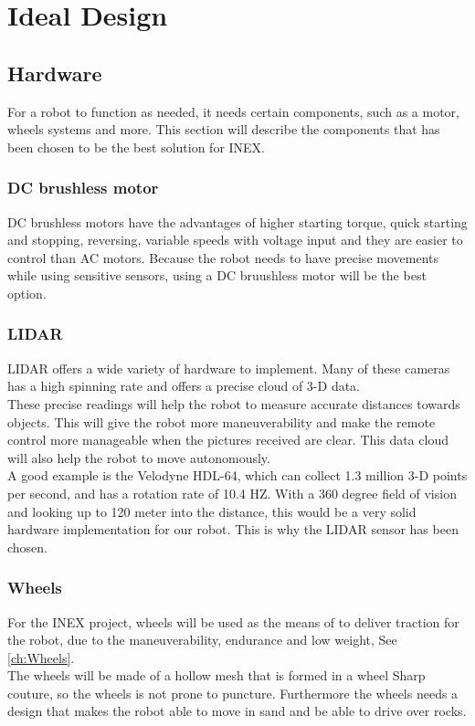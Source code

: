 \chapter{Ideal Design}\label{ch:Implementation Theory}

\section{Hardware}
For a robot to function as needed, it needs certain components, such as a motor, wheels systems and more. This section will describe the components that has been chosen to be the best solution for INEX.

\subsection{DC brushless motor}
DC brushless motors have the advantages of higher starting torque, quick starting and stopping, reversing, variable speeds with voltage input and they are easier to control than AC motors. Because the robot needs to have precise movements while using sensitive sensors, using a DC bruushless motor will be the best option.

\subsection{LIDAR}
LIDAR offers a wide variety of hardware to implement. Many of these cameras has a high spinning rate and offers a precise cloud of 3-D data.\\
These precise readings will help the robot to measure accurate distances towards objects. This will give the robot more maneuverability and make the remote control more manageable when the pictures received are clear. This data cloud will also help the robot to move autonomously.\\
A good example is the Velodyne HDL-64, which can collect 1.3 million 3-D points per second, and has a rotation rate of 10.4 HZ. With a 360 degree field of vision and looking up to 120 meter into the distance, this would be a very solid hardware implementation for our robot. \cite{Lidar360}
This is why the LIDAR sensor has been chosen. 


\subsection{Wheels}
For the INEX project, wheels will be used as the means of to deliver traction for the robot, due to the maneuverability, endurance and low weight, See \ref{ch:Wheels}.\\
The wheels will be made of a hollow mesh that is formed in a wheel Sharp couture, so the wheels is not prone to puncture. Furthermore the wheels needs a design that makes the robot able to move in sand and be able to drive over rocks.  

